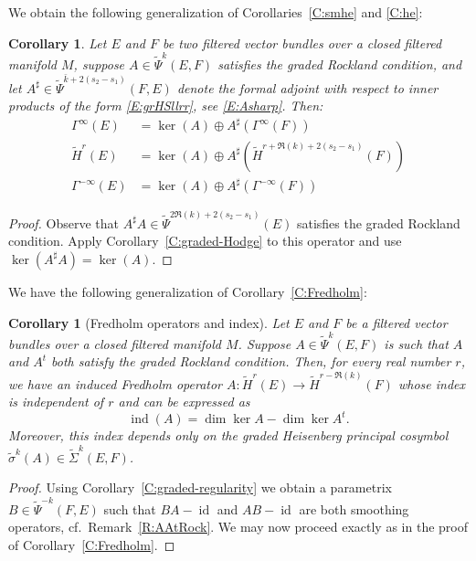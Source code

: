\documentclass[reqno,12pt]{amsart}
\DeclareMathOperator{\ind}{ind}
\DeclareMathOperator{\id}{id}
\theoremstyle{plain}
\newtheorem{corollary}[theorem]{Corollary}
\theoremstyle{definition}
\begin{document}
We obtain the following generalization of Corollaries~\ref{C:smhe} and \ref{C:he}:


\begin{corollary}\label{C:grmaxhesti}
Let $E$ and $F$ be two filtered vector bundles over a closed filtered manifold $M$, suppose $A\in\tilde\Psi^k(E,F)$ satisfies the graded Rockland condition, and let $A^\sharp\in\tilde\Psi^{\bar k+2(s_2-s_1)}(F,E)$ denote the formal adjoint with respect to inner products of the form \eqref{E:grHSllrr}, see \eqref{E:Asharp}.
Then:
\begin{align*}
\Gamma^\infty(E)&=\ker(A)\oplus A^\sharp(\Gamma^\infty(F))\\
\tilde H^r(E)&=\ker(A)\oplus A^\sharp(\tilde H^{r+\Re(k)+2(s_2-s_1)}(F))\\
\Gamma^{-\infty}(E)&=\ker(A)\oplus A^\sharp(\Gamma^{-\infty}(F))
\end{align*}
\end{corollary}


\begin{proof}
Observe that $A^\sharp A\in\tilde\Psi^{2\Re(k)+2(s_2-s_1)}(E)$ satisfies the graded Rockland condition.
Apply Corollary~\ref{C:graded-Hodge} to this operator and use $\ker(A^\sharp A)=\ker(A)$.
\end{proof}


We have the following generalization of Corollary~\ref{C:Fredholm}:


\begin{corollary}[Fredholm operators and index]\label{C:graded-Fredholm}
Let $E$ and $F$ be a filtered vector bundles over a closed filtered manifold $M$.
Suppose $A\in\tilde\Psi^k(E,F)$ is such that $A$ and $A^t$ both satisfy the graded Rockland condition.
Then, for every real number $r$, we have an induced Fredholm operator $A\colon\tilde H^r(E)\to\tilde H^{r-\Re(k)}(F)$ whose index is independent of $r$ and can be expressed as
$$
\ind(A)=\dim\ker A-\dim\ker A^t.
$$
Moreover, this index depends only on the graded Heisenberg principal cosymbol $\tilde\sigma^k(A)\in\tilde\Sigma^k(E,F)$.
\end{corollary}


\begin{proof}
Using Corollary~\ref{C:graded-regularity} we obtain a parametrix $B\in\tilde\Psi^{-k}(F,E)$ such that $BA-\id$ and $AB-\id$ are both smoothing operators, cf.\ Remark~\ref{R:AAtRock}.
We may now proceed exactly as in the proof of Corollary~\ref{C:Fredholm}.
\end{proof}
\end{document}
